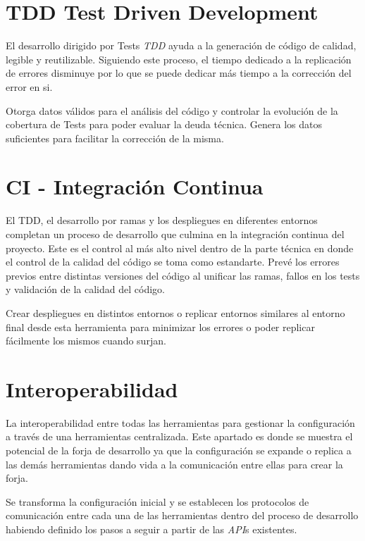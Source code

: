 
\section{TDD Test Driven Development}
\label{sec:tdd}

\par El desarrollo dirigido por Tests \emph{TDD} ayuda a la generación de código de calidad, legible y reutilizable. Siguiendo este proceso, el tiempo dedicado a la replicación de errores disminuye por lo que se puede dedicar más tiempo a la corrección del error en si.

\par Otorga datos válidos para el análisis del código y controlar la evolución de la cobertura de Tests para poder evaluar la deuda técnica. Genera los datos suficientes para facilitar la corrección de la misma.


\section{CI - Integración Continua}
\label{sec:integracion-continua}

\par El TDD, el desarrollo por ramas y los despliegues en diferentes entornos completan un proceso de desarrollo que culmina en la integración continua del proyecto. Este es el control al más alto nivel dentro de la parte técnica en donde el control de la calidad del código se toma como estandarte. Prevé los errores previos entre distintas versiones del código al unificar las ramas, fallos en los tests y validación de la calidad del código.

\par Crear despliegues en distintos entornos o replicar entornos similares al entorno final desde esta herramienta para minimizar los errores o poder replicar fácilmente los mismos cuando surjan.


\section{Interoperabilidad}
\label{sec:interoperabilidad}

\par La interoperabilidad entre todas las herramientas para gestionar la configuración a través de una herramientas centralizada. Este apartado es donde se muestra el potencial de la forja de desarrollo ya que la configuración se expande o replica a las demás herramientas dando vida a la comunicación entre ellas para crear la forja.

\par Se transforma la configuración inicial y se establecen los protocolos de comunicación entre cada una de las herramientas dentro del proceso de desarrollo habiendo definido los pasos a seguir a partir de las \emph{API}s existentes.

